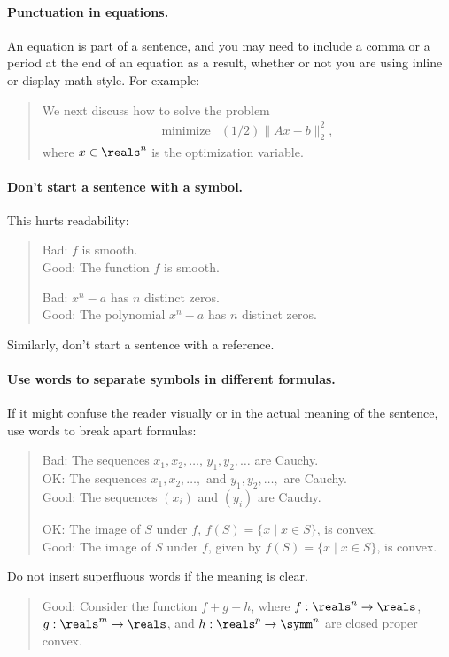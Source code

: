 \documentclass[12pt]{article}
\begin{document}
\paragraph{Punctuation in equations.}
An equation is part of a sentence, and you may need to include a comma or a period
at the end of an equation as a result, whether or not you are using inline or
display math style. For example:
\begin{quote}
    We next discuss how to solve the problem
    \[
        \begin{array}{ll}
            \mbox{minimize} & (1/2)\|Ax - b\|_2^2,
        \end{array}
    \]
    where $x \in \reals^n$ is the optimization variable.
\end{quote}
\paragraph{Don't start a sentence with a symbol.}
This hurts readability:
\begin{quote}
Bad: $f$ is smooth.\\
Good: The function $f$ is smooth.

Bad: $x^n - a$ has $n$ distinct zeros. \\
Good: The polynomial $x^n - a$ has $n$ distinct zeros.
\end{quote}
Similarly, don't start a sentence with a reference.

\paragraph{Use words to separate symbols in different formulas.}
If it might confuse the reader visually or in the actual
meaning of the sentence, use words to break apart formulas:
\begin{quote}
Bad: The sequences $x_1, x_2, \dots$, $y_1, y_2, \dots$ are Cauchy. \\
OK: The sequences $x_1, x_2, \dots,$ and $y_1, y_2, \dots,$ are Cauchy. \\
Good: The sequences $(x_i)$ and $(y_i)$ are Cauchy.

OK: The image of $S$ under $f$, $f(S) = \{ x \mid x \in S \}$, is convex. \\
Good: The image of $S$ under $f$, given by $f(S) = \{ x \mid x \in S \}$, is convex.
\end{quote}
Do not insert superfluous words if the meaning is clear.
\begin{quote}
Good: Consider the function $f + g + h$, where $f : \reals^n \to
\reals$, $g : \reals^m \to \reals$, and $h : \reals^p \to \symm^n$ are closed
proper convex.
\end{quote}
\end{document}
